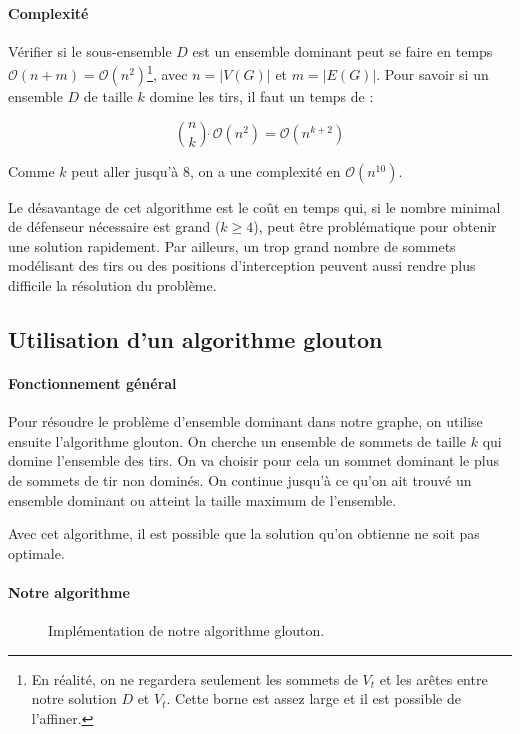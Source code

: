 \documentclass[12pt]{article}
\begin{document}
\paragraph{Complexité} Vérifier si le sous-ensemble $D$ est un ensemble dominant peut se faire en temps $\mathcal{O}(n+m) = \mathcal{O}(n^2)$\footnote{En réalité, on ne regardera seulement les sommets de $V_t$ et les arêtes entre notre solution $D$ et $V_t$. Cette borne est assez large et il est possible de l'affiner.}, avec $n = |V(G)|$ et $m = |E(G)|$. Pour savoir si un ensemble $D$ de taille $k$ domine les tirs, il faut un temps de :

\begin{equation*}
  \binom{n}{k} \dot\  \mathcal{O}(n^{2}) = \mathcal{O}(n^{k+2})
\end{equation*}

Comme $k$ peut aller jusqu'à 8, on a une complexité en $\mathcal{O}(n^{10})$.

Le désavantage de cet algorithme est le coût en temps qui, si le nombre minimal de défenseur nécessaire est grand ($k \geqslant 4$), peut être problématique pour obtenir une solution rapidement. Par ailleurs, un trop grand nombre de sommets modélisant des tirs ou des positions d'interception peuvent aussi rendre plus difficile la résolution du problème.

\subsection{Utilisation d'un algorithme glouton}

\paragraph{Fonctionnement général} Pour résoudre le problème d'ensemble dominant dans notre graphe, on utilise ensuite l'algorithme glouton. On cherche un ensemble de sommets de taille $k$ qui domine l'ensemble des tirs. On va choisir pour cela un sommet dominant le plus de sommets de tir non dominés. On continue jusqu'à ce qu'on ait trouvé un ensemble dominant ou atteint la taille maximum de l'ensemble.

Avec cet algorithme, il est possible que la solution qu'on obtienne ne soit pas optimale.


\paragraph{Notre algorithme}

\begin{figure}[h!]
  \begin{algorithm}[H]
    \BlankLine
  \end{algorithm}
  \caption{Implémentation de notre algorithme glouton.}
\end{figure}
\end{document}
